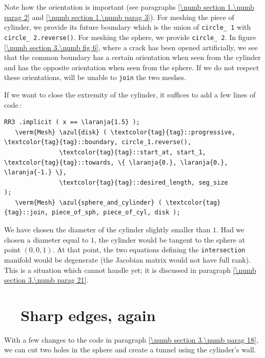 Note how the orientation is important (see paragraphs \ref{\numb section 1.\numb parag 2}
and \ref{\numb section 1.\numb parag 3}).
For meshing the piece of cylinder, we provide its future boundary which is the union of
{\small\tt circle\_\,1} with {\small\tt circle\_\,2.reverse()}.
For meshing the sphere, we provide {\small\tt circle\_\,2}.
In figure \ref{\numb section 3.\numb fig 6}, where a crack has been opened artificially,
we see that the common boundary has a certain orientation when seen from the cylinder and
has the opposite orientation when seen from the sphere.
If we do not respect these orientations, {\maniFEM} will be unable to {\small\tt join} the two
meshes.

If we want to close the extremity of the cylinder, it suffices to add a few lines of code$\,$:

\begin{Verbatim}[commandchars=\\\{\},formatcom=\small\tt,
   baselinestretch=0.94,framesep=2mm                     ]
   RR3 .implicit ( x == \laranja{1.5} );
   \verm{Mesh} \azul{disk} ( \textcolor{tag}{tag}::progressive, \textcolor{tag}{tag}::boundary, circle_1.reverse(),
               \textcolor{tag}{tag}::start_at, start_1, \textcolor{tag}{tag}::towards, \{ \laranja{0.}, \laranja{0.}, \laranja{-1.} \},
               \textcolor{tag}{tag}::desired_length, seg_size                         );
   \verm{Mesh} \azul{sphere_and_cylinder} ( \textcolor{tag}{tag}::join, piece_of_sph, piece_of_cyl, disk );
\end{Verbatim}

We have chosen the diameter of the cylinder slightly smaller than $1$.
Had we chosen a diameter equal to $1$, the cylinder would be tangent to the sphere at point
$ (0,0,1) $.
At that point, the two equations defining the {\small\tt intersection} manifold would be
degenerate (the Jacobian matrix would not have full rank).
This is a situation which {\maniFEM} cannot handle yet; it is discussed in paragraph
\ref{\numb section 3.\numb parag 21}.


\section{~~Sharp edges, again}\label{\numb section 3.\numb parag 19}

With a few changes to the code in paragraph \ref{\numb section 3.\numb parag 18},
we can cut two holes in the sphere and create a tunnel using the cylinder's wall.
\medskip

